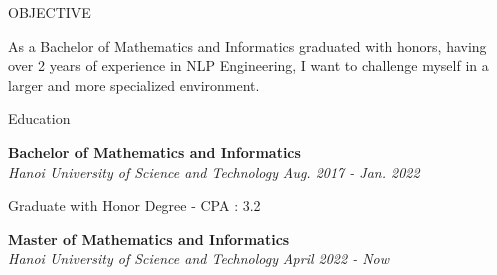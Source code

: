 \documentclass{resume} %
\begin{document}

\begin{rSection}{OBJECTIVE}

{As a Bachelor of Mathematics and Informatics graduated with honors, having over 2 years of experience in NLP Engineering, I want to challenge myself in a larger and more specialized environment.}


\end{rSection}

\begin{rSection}{Education}

{\bf Bachelor of Mathematics and Informatics}\\
\textit{ Hanoi University of Science and Technology} \hfill {\textit{Aug. 2017 - Jan. 2022}}

Graduate with Honor Degree - CPA : 3.2

{\bf Master of Mathematics and Informatics}\\
\textit{Hanoi University of Science and Technology} \hfill {\textit{April 2022 - Now}}

\end{rSection}

\end{document}
